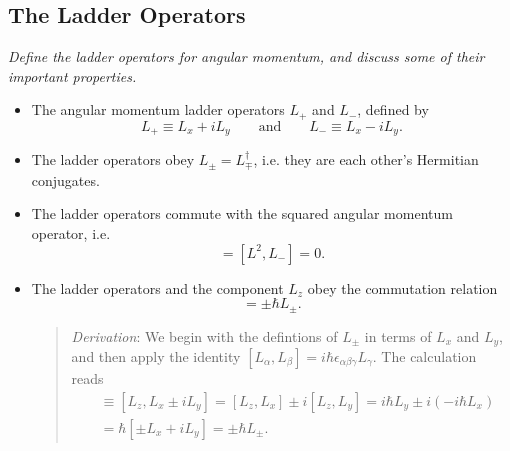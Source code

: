 \documentclass[11pt, a4paper]{article}
\newcommand{\eqtext}[1]{\qquad \text{#1} \qquad}
\newcommand{\Herm}{Hermitian\xspace}
\begin{document}
\subsection{The Ladder Operators}
\textit{Define the ladder operators for angular momentum, and discuss some of their important properties.}
\begin{itemize}
	\item The angular momentum ladder operators $ L_{+} $ and $ L_{-} $, defined by
	\begin{equation*}
		L_{+} \equiv L_{x} + iL_{y} \eqtext{and} L_{-} \equiv L_{x} - i L_{y}.
	\end{equation*}
	
    \item The ladder operators obey $ L_{\pm} = L_{\mp}^{\dagger} $, i.e. they are each other's \Herm conjugates.
	
	\item The ladder operators commute with the squared angular momentum operator, i.e.
	\begin{equation*}
		[L^{2}, L_{+}] = [L^{2}, L_{-}] = 0.
	\end{equation*}
	
	
    \item The ladder operators and the component $ L_{z} $ obey the commutation relation
    \begin{equation*}
        [L_{z}, L_{\pm}] = \pm \hbar L_{\pm}.
    \end{equation*}
    \begin{quote}
        \textit{Derivation}: We begin with the defintions of $ L_{\pm} $ in terms of $ L_{x} $ and $ L_{y} $, and then apply the identity $ [L_{\alpha}, L_{\beta}] = i \hbar \epsilon_{\alpha \beta \gamma} L_{\gamma} $. The calculation reads
        \begin{align*}
            [L_{z}, L_{\pm}] &\equiv [L_{z}, L_{x} \pm i L_{y}] = [L_{z}, L_{x}] \pm i [L_{z}, L_{y}] = i \hbar L_{y} \pm i(-i \hbar L_{x})\\
            & = \hbar [\pm L_{x} + iL_{y}] = \pm \hbar L_{\pm}.
        \end{align*}
    \end{quote} 
	

\end{itemize}
\end{document}
